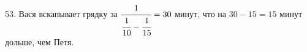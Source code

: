 53. Вася вскапывает грядку за $\cfrac{1}{\cfrac{1}{10}-\cfrac{1}{15}}=30$ минут, что на $30-15=15$ минут дольше, чем Петя.\\
